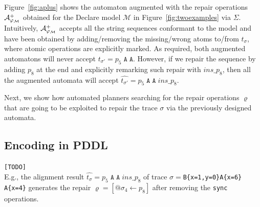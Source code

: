 Figure~\ref{fig:aplus} shows the automaton augmented with the repair operations $\mathcal{A}_{\varphi_{\tiny\mathcal{M}}}^+$ obtained for the Declare model $\mathcal{M}$ in Figure~\ref{fig:twoexamples} via $\Sigma$. Intuitively, $\mathcal{A}_{\varphi_{\tiny\mathcal{M}}}^+$ accepts all the string sequences conformant to the model and have been obtained by adding/removing the missing/wrong atoms to/from $t_\sigma$, where atomic operations are explicitly marked. As required, both augmented automatons will never accept $t_{\sigma'}=p_5\;\texttt{A}\;\texttt{A}$. However, if we repair the sequence by adding $p_8$ at the end and explicitly remarking such repair with $\textit{ins\_}p_8$, then all the augmented automata will accept $\hat{t_{\sigma'}}=p_5\;\texttt{A}\;\texttt{A}\;\textit{ins\_}p_8$.

Next, we show how automated planners searching for the repair operations $\varrho$ that are going to be exploited to repair the trace $\sigma$ via the previously designed automata.

\subsection{Encoding in PDDL}\label{ssec:eip}
\texttt{\color{red}[TODO]}
\\

E.g., the alignment result $\hat{t_\sigma}=p_5\;\texttt{A}\;\texttt{A}\;\textit{ins\_}p_8$ of trace $\sigma=$\texttt{B\{x=1,y=0\}A\{x=6\}\\A\{x=4\}} generates the repair $\varrho=[@\sigma_4\leftarrow p_8]$ after removing the \texttt{sync} operations.

